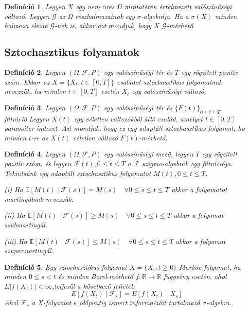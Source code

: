 \documentclass[12pt, a4paper]{article}
\newtheorem{definition}{Definíció}[subsection]
\begin{document}
\begin{definition}\label{def_otodik}
\cite{shreve2004} Legyen $X$ egy nem üres $\Omega$ mintatéren értelmezett valószínűségi változó. Legyen $\mathcal{G}$ az $\Omega$ részhalmazainak egy $\sigma$-algebrája. Ha a $\sigma(X)$ minden halmaza eleme $\mathcal{G}$-nek is, akkor azt mondjuk, hogy $X$ $\mathcal{G}$-mérhető.
\end{definition}

\subsection{Sztochasztikus folyamatok}

\begin{definition}\label{def_hatodik}
\cite{shreve2004} Legyen $(\Omega, \mathcal{F}, P)$ egy valószínűségi tér és $T$ egy rögzített pozitív szám. Ekkor az $X = \{X_t : t \in [0,T]\}$ családot sztochasztikus folyamatnak nevezzük, ha minden $t \in [0,T]$ esetén $X_t$ egy valószínűségi változó.
\end{definition}

\begin{definition}\label{def_hetedik}
\cite{shreve2004} Legyen $(\Omega, \mathcal{F}, P)$ egy valószínűségi tér és $\{F(t)\}_{0 \le t \le T}$ filtráció.Legyen $X(t)$ egy véletlen változókból álló család, amelyet $t \in [0,T]$ paraméter indexel. Azt mondjuk, hogy ez egy adaptált sztochasztikus folyamat, ha minden $t$-re az $X(t)$ véletlen változó $F(t)$-mérhető.
\end{definition}

\begin{definition}\label{def_nyolcadik}
\cite{shreve2004} Legyen $(\Omega, \mathcal{F}, P)$ egy valószínűségi mező, legyen $T$ egy rögzített pozitív szám, és legyen $\mathcal{F}(t), 0 \le t \le T$ a $\mathcal{F}$ szigma-algebrák egy filtrációja. Tekintsünk egy adaptált sztochasztikus folyamatot $M(t), 0 \le t \le T$.

(i) Ha $\mathbb{E}[M(t)\mid \mathcal{F}(s)] = M(s) \quad \forall 0 \le s \le t \le T$ akkor a folyamatot martingálnak nevezzük.

(ii) Ha $\mathbb{E}[M(t)\mid \mathcal{F}(s)] \ge M(s) \quad \forall 0 \le s \le t \le T$ akkor a folyamat szubmartingál.

(iii) Ha $\mathbb{E}[M(t)\mid \mathcal{F}(s)] \le M(s) \quad \forall 0 \le s \le t \le T$ akkor a folyamat szupermartingál.
\end{definition}

\begin{definition}\label{def_kilencedik}
Egy sztochasztikus folyamat $X = \{X_t : t \ge 0\}$ Markov-folyamat, ha minden $0 \le s < t$ és minden Borel-mérhető $f : \mathbb{R} \to \mathbb{R}$ függvény esetén, ahol $E|f(X_t)| < \infty$,teljesül a következő feltétel:
\[
E[f(X_t) \mid \mathcal{F}_s] = E[f(X_t) \mid X_s]
\]
Ahol $\mathcal{F}_s$ a $X$-folyamat $s$ időpontig ismert információit tartalmazó $\sigma$-algebra.
\end{definition}
\end{document}
